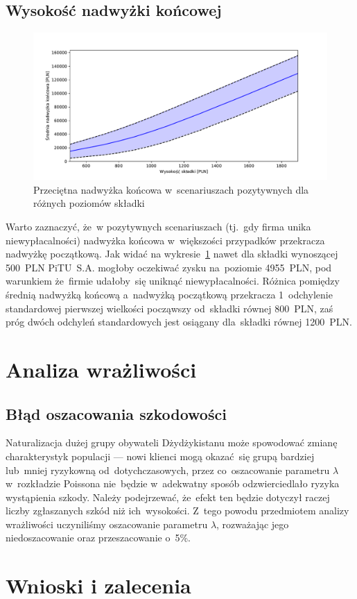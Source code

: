 \documentclass[12pt, a4paper, oneside]{mwart} %
\begin{document}
\subsection{Wysokość nadwyżki końcowej}
\begin{figure}
\centering
\includegraphics[width = \textwidth]{n=1000/nadwyzka.pdf}
\caption{Przeciętna nadwyżka końcowa w~scenariuszach pozytywnych dla różnych poziomów składki}
\label{nadwyzka_n1000}
\end{figure}
Warto zaznaczyć, że~w pozytywnych scenariuszach (tj.~gdy firma unika niewypłacalności) nadwyżka końcowa w~większości przypadków przekracza nadwyżkę początkową. Jak widać na wykresie~\ref{nadwyzka_n1000} nawet dla składki wynoszącej 500~PLN PiTU~S.A. mogłoby oczekiwać zysku na~poziomie 4955~PLN, pod warunkiem że~firmie udałoby~się uniknąć niewypłacalności. Różnica pomiędzy średnią nadwyżką końcową a~nadwyżką początkową przekracza 1~odchylenie standardowej pierwszej wielkości począwszy od~składki równej 800~PLN, zaś próg dwóch odchyleń standardowych jest osiągany dla~składki równej 1200~PLN.

\section{Analiza wrażliwości}

\subsection{Błąd oszacowania szkodowości}
Naturalizacja dużej grupy obywateli Dżydżykistanu może spowodować zmianę charakterystyk populacji --- nowi klienci mogą okazać~się grupą bardziej lub~mniej ryzykowną od~dotychczasowych, przez co~oszacowanie parametru $\lambda$ w~rozkładzie Poissona nie~będzie w~adekwatny sposób odzwierciedlało ryzyka wystąpienia szkody. Należy podejrzewać, że~efekt ten będzie dotyczył raczej liczby zgłaszanych szkód niż ich~wysokości. Z~tego powodu przedmiotem analizy wrażliwości uczyniliśmy oszacowanie parametru $\lambda$, rozważając jego niedoszacowanie oraz przeszacowanie o~5\%.

\section{Wnioski i zalecenia}
%
\end{document}
